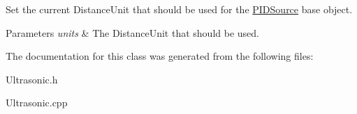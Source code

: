\-Set the current \-Distance\-Unit that should be used for the \hyperlink{classPIDSource}{\-P\-I\-D\-Source} base object.


\begin{DoxyParams}{\-Parameters}
{\em units} & \-The \-Distance\-Unit that should be used. \\
\hline
\end{DoxyParams}


\-The documentation for this class was generated from the following files\-:\begin{DoxyCompactItemize}
\item 
\-Ultrasonic.\-h\item 
\-Ultrasonic.\-cpp\end{DoxyCompactItemize}
